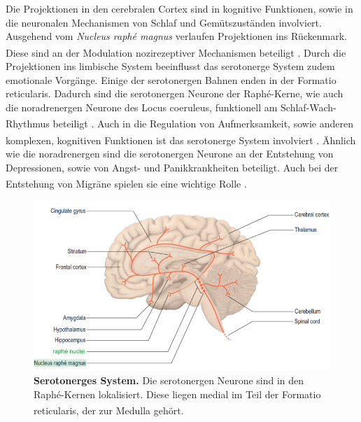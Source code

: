 \documentclass[12pt,a4paper,pdftex]{article}
\begin{document}
Die Projektionen in den cerebralen Cortex sind in kognitive Funktionen, sowie in die neuronalen Mechanismen von Schlaf und  Gemütszuständen involviert. Ausgehend vom \textit{Nucleus raphé magnus} verlaufen Projektionen ins Rückenmark. Diese sind an der Modulation nozirezeptiver Mechanismen beteiligt \textsuperscript{\cite[9]{crossman2014neuroanatomy}}. Durch die Projektionen ins limbische System beeinflusst das serotonerge System zudem emotionale Vorgänge. Einige der serotonergen Bahnen enden in der Formatio reticularis. Dadurch sind die serotonergen Neurone der Raphé-Kerne, wie auch die noradrenergen Neurone des Locus coeruleus, funktionell am Schlaf-Wach-Rhythmus beteiligt \textsuperscript{\cite[6]{trepel2011neuroanatomie}}. Auch in die Regulation von Aufmerksamkeit, sowie anderen komplexen, kognitiven Funktionen ist das serotonerge System involviert \textsuperscript{\cite[46]{kandel2013principles}}. Ähnlich wie die noradrenergen sind die serotonergen Neurone an der Entstehung von Depressionen, sowie von Angst- und Panikkrankheiten beteiligt. Auch bei der Entstehung von Migräne spielen sie eine wichtige Rolle \textsuperscript{\cite[6]{trepel2011neuroanatomie}}.

\begin{figure}[H]
    \centering
    \includegraphics[width=\textwidth]{pictures/Bilder_monoamine_systeme/serotonerges_system.PNG}
    \caption[Serotonerges System]{\textbf{Serotonerges System.} Die serotonergen Neurone sind in den Raphé-Kernen lokalisiert. Diese liegen medial im Teil der Formatio reticularis, der zur Medulla gehört. \textsuperscript{\cite[9]{crossman2014neuroanatomy}}}
    \label{fig:serotonerges_system}
\end{figure}{}
\end{document}

